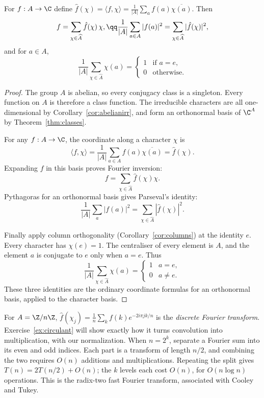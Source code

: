 \begin{theorem}\label{thm:fourier}
For $f:A\to\C$ define $\hat f(\chi)=\langle f,\chi\rangle=\frac1{|A|}\sum_{a}f(a)\overline{\chi(a)}$. Then
\[
\begin{gathered}f=\sum_{\chi\in\widehat A}\hat f(\chi)\,\chi,\qq\frac1{|A|}\sum_{a\in A}|f(a)|^2=\sum_{\chi\in\widehat A}|\hat f(\chi)|^2,\end{gathered}
\]
and for $a\in A$,
\[
\frac1{|A|}\sum_{\chi\in\widehat A}\chi(a)=\begin{cases}1&\text{if }a=e,\\0&\text{otherwise.}\end{cases}
\]
\end{theorem}
\begin{proof}
The group $A$ is abelian, so every
conjugacy class is a singleton.
Every function on $A$ is therefore
a class function.
The irreducible characters are all
one-dimensional by
Corollary~\ref{cor:abelianirr},
and form an orthonormal basis
of $\C^A$ by Theorem~\ref{thm:classes}.

For any $f:A\to\C$, the coordinate
along a character $\chi$ is
\[
\langle f,\chi\rangle
=\frac1{|A|}\sum_{a\in A}
f(a)\overline{\chi(a)}
=\widehat f(\chi).
\]
Expanding $f$ in this basis proves
Fourier inversion:
\[
f=\sum_{\chi\in\widehat A}
\widehat f(\chi)\chi.
\]
Pythagoras for an orthonormal basis
gives Parseval's identity:
\[
\frac1{|A|}\sum_a|f(a)|^2
=\sum_{\chi\in\widehat A}
|\widehat f(\chi)|^2.
\]

Finally apply column orthogonality
(Corollary~\ref{cor:columns})
at the identity $e$. Every character has
$\chi(e)=1$. The centraliser of
every element is $A$, and the
element $a$ is conjugate to $e$
only when $a=e$. Thus
\[
\boxed{\frac1{|A|}\sum_{\chi\in\widehat A}
\chi(a)=\begin{cases}
1&a=e,\\0&a\ne e.
\end{cases}}
\]
These three identities are the
ordinary coordinate formulas
for an orthonormal basis,
applied to the character basis.
\end{proof}

For $A=\Z/n\Z$, $\hat f(\chi_j)=\frac1n\sum_kf(k)e^{-2i\pi jk/n}$ is the \emph{discrete Fourier transform}. Exercise~\ref{ex:circulant} will show exactly how it turns convolution into multiplication, with our normalization. When $n=2^k$, separate a Fourier sum into its even and odd indices. Each part is a transform of length $n/2$, and combining the two requires $O(n)$ additions and multiplications. Repeating the split gives $T(n)=2T(n/2)+O(n)$; the $k$ levels each cost $O(n)$, for $O(n\log n)$ operations. This is the radix-two fast Fourier transform, associated with Cooley and Tukey.


